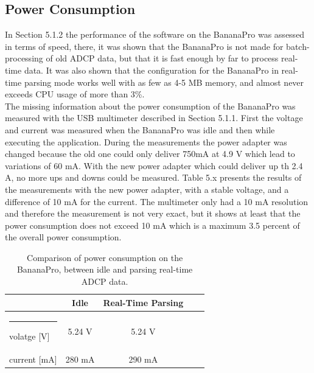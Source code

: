 \subsection{Power Consumption}
In Section 5.1.2 the performance of the software on the BananaPro was assessed in terms of speed, there, it was shown that the BananaPro is not made for batch-processing of old ADCP data, but that it is fast enough by far to process real-time data. It was also shown that the configuration for the BananaPro in real-time parsing mode works well with as few as 4-5 MB memory, and almost never exceeds CPU usage of more than 3\%.\\ 
The missing information about the power consumption of the BananaPro was measured with the USB multimeter described in Section 5.1.1. First the voltage and current was measured when the BananaPro was idle and then while executing the application. During the measurements the power adapter was changed because the old one could only deliver 750mA at 4.9 V which lead to variations of 60 mA. With the new power adapter which could deliver up th 2.4 A, no more ups and downs could be measured. Table 5.x presents the results of the measurements with the new power adapter, with a stable voltage, and a difference of 10 mA for the current. The multimeter only had a 10 mA resolution and therefore the measurement is not very exact, but it shows at least that the power consumption does not exceed 10 mA which is a maximum 3.5 percent of the overall power consumption.

\begin{table}[h]
	\centering
	\begin{tabular}{l@{\quad}c@{\quad}c@{\quad}c@{\quad}c} \hline \rule{0pt}{8pt}
	  & Idle & Real-Time Parsing \rule{0pt}{8pt} \\\hline \rule{-2pt}{8pt}
	  volatge [V] & 5.24 V & 5.24 V\\
	  current [mA] & 280 mA& 290 mA\\ 
	  \hline
	\end{tabular}
	\caption{Comparison of power consumption on the BananaPro, between idle and parsing real-time ADCP data.}
	\label{tab:energy}
\end{table}

